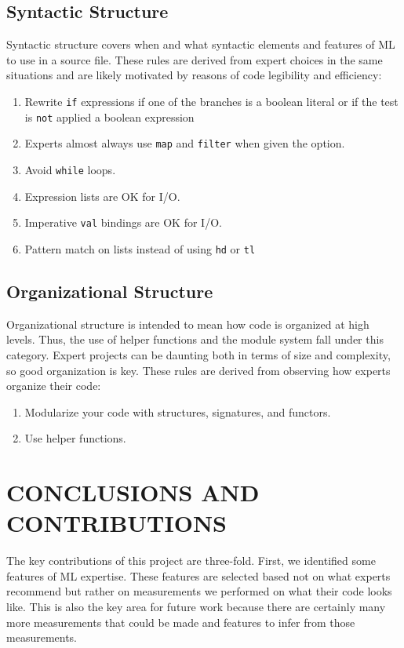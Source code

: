 \documentclass[12pt,abstracton]{scrartcl}
\begin{document}
\subsection{Syntactic Structure}
Syntactic structure covers when and what syntactic elements and features of ML to use
in a source file. These rules are derived from expert choices in the same
situations and are likely motivated by reasons of code legibility and efficiency:
\begin{enumerate}
\item Rewrite \texttt{if} expressions if one of the branches is a boolean literal or if the test is \texttt{not} applied a boolean expression
\item Experts almost always use \texttt{map} and \texttt{filter} when given the option.
\item Avoid \texttt{while} loops.
\item Expression lists are OK for I/O.
\item Imperative \texttt{val} bindings are OK for I/O.
\item Pattern match on lists instead of using \texttt{hd} or \texttt{tl}
\end{enumerate}
\subsection{Organizational Structure}
Organizational structure is intended to mean how code is organized at high levels.
Thus, the use of helper functions and the module system fall under this category.
Expert projects can be daunting both in terms of size and complexity, so good
organization is key. These rules are derived from observing how experts organize their code:
\begin{enumerate}
\item Modularize your code with structures, signatures, and functors.
\item Use helper functions.
\end{enumerate}
\section{CONCLUSIONS AND CONTRIBUTIONS}\label{sec:future}
The key contributions of this project are three-fold. First, we
identified some features of ML expertise. These features are
selected based not on what experts recommend but rather on
measurements we performed on what their code looks like.
This is also the key area for future work because there are
certainly many more measurements that could be made and features to infer from those measurements.
\end{document}
